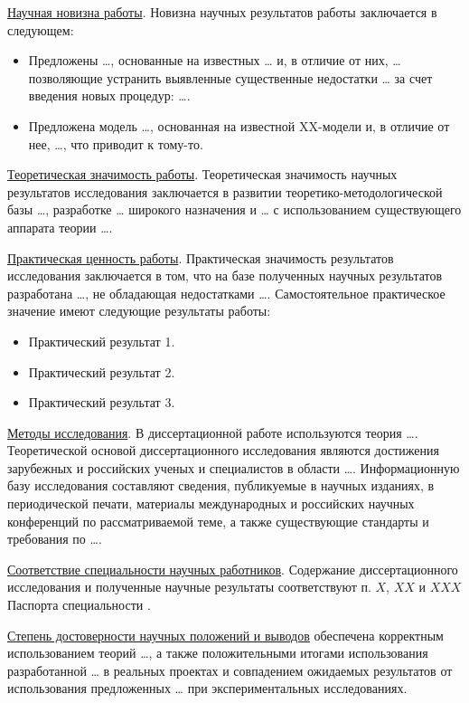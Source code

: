 \underline{Научная новизна работы}. Новизна научных результатов работы
заключается в следующем:
\begin{itemize}
\item Предложены \dots{}, основанные на известных \dots{} и, в отличие
  от них, \dots{} позволяющие устранить выявленные существенные
  недостатки \dots{} за счет введения новых процедур: \dots{}.
\item Предложена модель \dots{}, основанная на известной XX-модели и,
  в отличие от нее, \dots{}, что приводит к тому-то.
\end{itemize}

\underline{Теоретическая значимость работы}. Теоретическая значимость
научных результатов исследования заключается в развитии
теоретико-методологической базы \dots{}, разработке \dots{} широкого
назначения и \dots{} с использованием существующего аппарата теории
\dots{}.

\underline{Практическая ценность работы}. Практическая значимость
результатов исследования заключается в том, что на базе полученных
научных результатов разработана \dots{}, не обладающая недостатками
\dots{}. Самостоятельное практическое значение имеют следующие
результаты работы:
\begin{itemize}
\item Практический результат 1.
\item Практический результат 2.
\item Практический результат 3.
\end{itemize}

\underline{Методы исследования}. В диссертационной работе используются
теория \dots{}. Теоретической основой диссертационного исследования
являются достижения зарубежных и российских ученых и специалистов в
области \dots{}. Информационную базу исследования составляют сведения,
публикуемые в научных изданиях, в периодической печати, материалы
международных и российских научных конференций по рассматриваемой
теме, а также существующие стандарты и требования по \dots{}.

\underline{Соответствие специальности научных работников}. Содержание
диссертационного исследования и полученные научные результаты
соответствуют п. $X$, $XX$ и $XXX$ Паспорта специальности \specnum{}
\specname{}.

\underline{Степень достоверности научных положений и выводов}
обеспечена корректным использованием теорий \dots{}, а также
положительными итогами использования разработанной \dots{} в реальных
проектах и совпадением ожидаемых результатов от использования
предложенных \dots{} при экспериментальных исследованиях.

